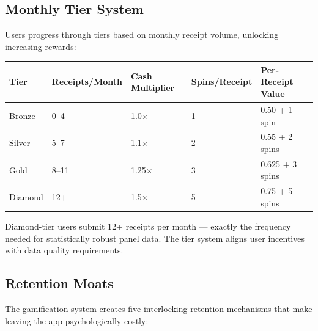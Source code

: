 \documentclass[11pt,a4paper]{article}
\begin{document}
\subsection{Monthly Tier System}

Users progress through tiers based on monthly receipt volume, unlocking increasing rewards:

\begin{center}
\renewcommand{\arraystretch}{1.4}
\begin{tabularx}{\textwidth}{L{2.5cm} C{2.5cm} C{2.5cm} C{2.5cm} C{3cm}}
\toprule
{}
\textbf{\color{white}Tier} & \textbf{\color{white}Receipts/Month} & \textbf{\color{white}Cash Multiplier} & \textbf{\color{white}Spins/Receipt} & \textbf{\color{white}Per-Receipt Value} \\
\midrule
Bronze & 0--4 & 1.0$\times$ & 1 & \texteuro{}0.50 + 1 spin \\
Silver & 5--7 & 1.1$\times$ & 2 & \texteuro{}0.55 + 2 spins \\
Gold & 8--11 & 1.25$\times$ & 3 & \texteuro{}0.625 + 3 spins \\
Diamond & 12+ & 1.5$\times$ & 5 & \texteuro{}0.75 + 5 spins \\
\bottomrule
\end{tabularx}
\end{center}

\vspace{0.3em}

{\small\color{milogray} Diamond-tier users submit 12+ receipts per month --- exactly the frequency needed for statistically robust panel data. The tier system aligns user incentives with data quality requirements.}

\subsection{Retention Moats}

The gamification system creates five interlocking retention mechanisms that make leaving the app psychologically costly:
\end{document}
